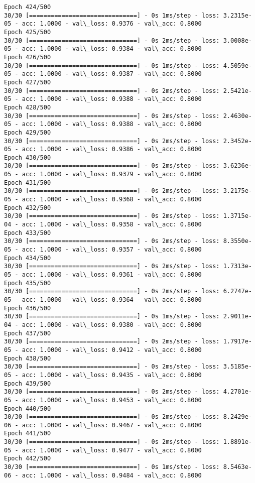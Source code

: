 \documentclass[11pt]{article}
\begin{document}
\begin{Verbatim}[commandchars=\\\{\}]
Epoch 424/500
30/30 [==============================] - 0s 1ms/step - loss: 3.2315e-05 - acc: 1.0000 - val\_loss: 0.9376 - val\_acc: 0.8000
Epoch 425/500
30/30 [==============================] - 0s 2ms/step - loss: 3.0008e-05 - acc: 1.0000 - val\_loss: 0.9384 - val\_acc: 0.8000
Epoch 426/500
30/30 [==============================] - 0s 1ms/step - loss: 4.5059e-05 - acc: 1.0000 - val\_loss: 0.9387 - val\_acc: 0.8000
Epoch 427/500
30/30 [==============================] - 0s 2ms/step - loss: 2.5421e-05 - acc: 1.0000 - val\_loss: 0.9388 - val\_acc: 0.8000
Epoch 428/500
30/30 [==============================] - 0s 2ms/step - loss: 2.4630e-05 - acc: 1.0000 - val\_loss: 0.9388 - val\_acc: 0.8000
Epoch 429/500
30/30 [==============================] - 0s 2ms/step - loss: 2.3452e-05 - acc: 1.0000 - val\_loss: 0.9386 - val\_acc: 0.8000
Epoch 430/500
30/30 [==============================] - 0s 2ms/step - loss: 3.6236e-05 - acc: 1.0000 - val\_loss: 0.9379 - val\_acc: 0.8000
Epoch 431/500
30/30 [==============================] - 0s 2ms/step - loss: 3.2175e-05 - acc: 1.0000 - val\_loss: 0.9368 - val\_acc: 0.8000
Epoch 432/500
30/30 [==============================] - 0s 2ms/step - loss: 1.3715e-04 - acc: 1.0000 - val\_loss: 0.9358 - val\_acc: 0.8000
Epoch 433/500
30/30 [==============================] - 0s 2ms/step - loss: 8.3550e-05 - acc: 1.0000 - val\_loss: 0.9357 - val\_acc: 0.8000
Epoch 434/500
30/30 [==============================] - 0s 2ms/step - loss: 1.7313e-05 - acc: 1.0000 - val\_loss: 0.9361 - val\_acc: 0.8000
Epoch 435/500
30/30 [==============================] - 0s 2ms/step - loss: 6.2747e-05 - acc: 1.0000 - val\_loss: 0.9364 - val\_acc: 0.8000
Epoch 436/500
30/30 [==============================] - 0s 1ms/step - loss: 2.9011e-04 - acc: 1.0000 - val\_loss: 0.9380 - val\_acc: 0.8000
Epoch 437/500
30/30 [==============================] - 0s 2ms/step - loss: 1.7917e-05 - acc: 1.0000 - val\_loss: 0.9412 - val\_acc: 0.8000
Epoch 438/500
30/30 [==============================] - 0s 2ms/step - loss: 3.5185e-05 - acc: 1.0000 - val\_loss: 0.9435 - val\_acc: 0.8000
Epoch 439/500
30/30 [==============================] - 0s 2ms/step - loss: 4.2701e-05 - acc: 1.0000 - val\_loss: 0.9453 - val\_acc: 0.8000
Epoch 440/500
30/30 [==============================] - 0s 2ms/step - loss: 8.2429e-06 - acc: 1.0000 - val\_loss: 0.9467 - val\_acc: 0.8000
Epoch 441/500
30/30 [==============================] - 0s 2ms/step - loss: 1.8891e-05 - acc: 1.0000 - val\_loss: 0.9477 - val\_acc: 0.8000
Epoch 442/500
30/30 [==============================] - 0s 1ms/step - loss: 8.5463e-06 - acc: 1.0000 - val\_loss: 0.9484 - val\_acc: 0.8000

\end{Verbatim}
\end{document}
